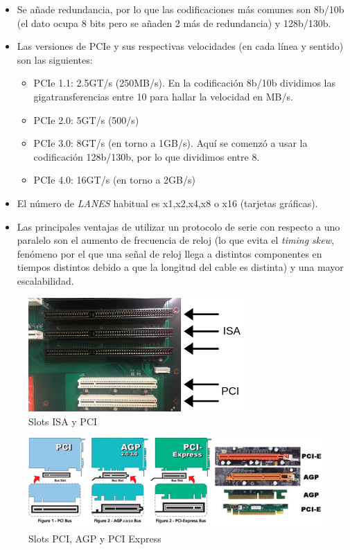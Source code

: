 \documentclass[12pt,spanish]{article}
\begin{document}
\begin{itemize}
\begin{itemize}
			\item Se añade redundancia, por lo que las codificaciones más comunes son 8b/10b (el dato ocupa 8 bits pero se añaden 2 más de redundancia) y 128b/130b.
			\item Las versiones de PCIe y sus respectivas velocidades (en cada línea y sentido) son las siguientes:
			\begin{itemize}
				\item PCIe 1.1: 2.5GT/s (250MB/s). En la codificación 8b/10b dividimos las gigatransferencias entre 10 para hallar la velocidad en MB/s.
				\item PCIe 2.0: 5GT/s (500/s)
				\item PCIe 3.0: 8GT/s (en torno a 1GB/s). Aquí se comenzó a usar la codificación 128b/130b, por lo que dividimos entre 8.
				\item PCIe 4.0: 16GT/s (en torno a 2GB/s)
			\end{itemize}
			\item El número de \textit{LANES} habitual es x1,x2,x4,x8 o x16 (tarjetas gráficas).
			\item Las principales ventajas de utilizar un protocolo de serie con respecto a uno paralelo son el aumento de frecuencia de reloj (lo que evita el \textit{timing skew}, fenómeno por el que una señal de reloj llega a distintos componentes en tiempos distintos debido a que la longitud del cable es distinta) y una mayor escalabilidad.
		\end{itemize}
\end{itemize}

\begin{figure}[H]
	\centering
	\includegraphics[width=0.75\textwidth]{isapci.png}
	\caption{Slots ISA y PCI}
\end{figure}

\begin{figure}[H]
	\centering
	\includegraphics[width=\textwidth]{pcieagp.png}
	\caption{Slots PCI, AGP y PCI Express}
\end{figure}
\end{document}

